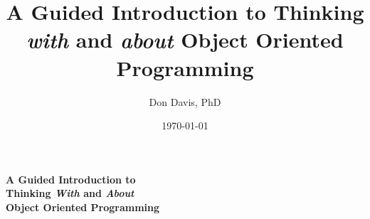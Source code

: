 \documentclass{article}
\title{A Guided Introduction to Thinking \emph{with} and \emph{about} Object Oriented Programming}
\author{Don Davis, PhD}
\date{\today}
\begin{document}
\begin{comment}

  1. Explain why object oriented programming
  2. Rabbit example
  3. Work backwards from Pokemon-like linked list example
  

\end{comment}

\begin{center}

  \textbf{
 {\LARGE A Guided Introduction to \\
  Thinking \emph{With} and \emph{About} \\ 
  Object Oriented Programming \\}
 }
\end{center}

\begin{flushleft}

\end{flushleft}
\end{document}
